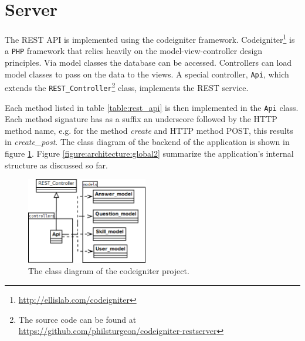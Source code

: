 \section{Server}

The REST API is implemented using the codeigniter framework. Codeigniter\footnote{\url{http://ellislab.com/codeigniter}} is a \texttt{PHP} framework that relies heavily on the model-view-controller design principles. Via model classes the database can be accessed. Controllers can load model classes to pass on the data to the views. A special controller, \texttt{Api}, which extends the \texttt{REST\_Controller}\footnote{The source code can be found at \url{https://github.com/philsturgeon/codeigniter-restserver}} class, implements the REST service.

Each method listed in table \ref{table:rest_api} is then implemented in the \texttt{Api} class. Each method signature has as a suffix an underscore followed by the HTTP method name, e.g. for the method \emph{create} and HTTP method POST, this results in \emph{create\_post}. The class diagram of the backend of the application is shown in figure \ref{figure:codeigniter:classdiagram}. Figure \ref{figure:architecture:global2} summarize the application's internal structure as discussed so far.

\begin{figure}
	
	\begin{center}
		\includegraphics[width=200px]{img/codeigniter_class_diagram}
		\caption{The class diagram of the codeigniter project.}
		\label{figure:codeigniter:classdiagram}
	\end{center}

\end{figure}

